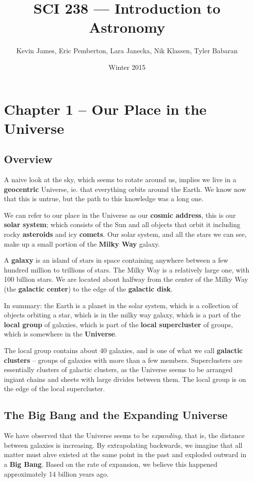 \documentclass[12pt]{article}
\begin{document}
\title{SCI 238 --- Introduction to Astronomy}
\author{Kevin James, Eric Pemberton, Lara Janecka, Nik Klassen, Tyler Babaran}
\date{\vspace{-2ex}Winter 2015}
\maketitle\HRule

\tableofcontents
\newpage

\section{Chapter 1 -- Our Place in the Universe}
\subsection{Overview}
A naive look at the sky, which seems to rotate around us, implies we live in a {\bf geocentric} Universe, ie. that everything orbits around the Earth. We know now that this is untrue, but the path to this knowledge was a long one.

We can refer to our place in the Universe as our {\bf cosmic address}, this is our {\bf solar system}; which consists of the Sun and all objects that orbit it including rocky {\bf asteroids} and icy {\bf comets}. Our solar system, and all the stars we can see, make up a small portion of the {\bf Milky Way} galaxy.

A {\bf galaxy} is an island of stars in space containing anywhere between a few hundred million to trillions of stars. The Milky Way is a relatively large one, with 100 billion stars. We are located about halfway from the center of the Milky Way (the {\bf galactic center}) to the edge of the {\bf galactic disk}.

In summary: the Earth is a planet in the solar system, which is a collection of objects orbiting a star, which is in the milky way galaxy, which is a part of the {\bf local group} of galaxies, which is part of the {\bf local supercluster} of groups, which is somewhere in the {\bf Universe}.

The local group contains about 40 galaxies, and is one of what we call {\bf galactic clusters} -- groups of galaxies with more than a few members. Superclusters are essentially clusters of galactic clusters, as the Universe seems to be arranged ingiant chains and sheets with large divides between them. The local group is on the edge of the local supercluster.

\subsection{The Big Bang and the Expanding Universe}
We have observed that the Universe seems to be \emph{expanding}, that is, the distance between galaxies is increasing. By extrapolating backwards, we imagine that all matter must ahve existed at the same point in the past and exploded outward in a {\bf Big Bang}. Based on the rate of expansion, we believe this happened approximately 14 billion years ago.
\end{document}
